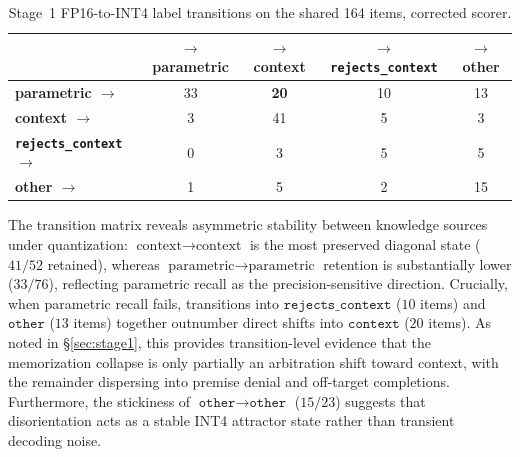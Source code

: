 \documentclass{article} %
\begin{document}
\FloatBarrier
\begin{table}[!t]
\caption{Stage~1 FP16-to-INT4 label transitions on the shared 164 items, corrected scorer.}
\label{tab:transitions}
\centering\small
\begin{tabular}{lcccc}
\toprule
 & $\to$ parametric & $\to$ context & $\to$ \texttt{rejects\_context} & $\to$ other \\
\midrule
\textbf{parametric $\to$} & 33 & \textbf{20} & 10 & 13 \\
\textbf{context $\to$} & 3 & 41 & 5 & 3 \\
\textbf{\texttt{rejects\_context} $\to$} & 0 & 3 & 5 & 5 \\
\textbf{other $\to$} & 1 & 5 & 2 & 15 \\
\bottomrule
\end{tabular}
\end{table}

The transition matrix reveals asymmetric stability between knowledge sources under quantization: $\text{context}\to\text{context}$ is the most preserved diagonal state ($41/52$ retained), whereas $\text{parametric}\to\text{parametric}$ retention is substantially lower ($33/76$), reflecting parametric recall as the precision-sensitive direction. Crucially, when parametric recall fails, transitions into $\texttt{rejects\_context}$ ($10$ items) and $\texttt{other}$ ($13$ items) together outnumber direct shifts into $\texttt{context}$ ($20$ items). As noted in \S\ref{sec:stage1}, this provides transition-level evidence that the memorization collapse is only partially an arbitration shift toward context, with the remainder dispersing into premise denial and off-target completions. Furthermore, the stickiness of $\texttt{other}\to\texttt{other}$ ($15/23$) suggests that disorientation acts as a stable INT4 attractor state rather than transient decoding noise.
\end{document}
